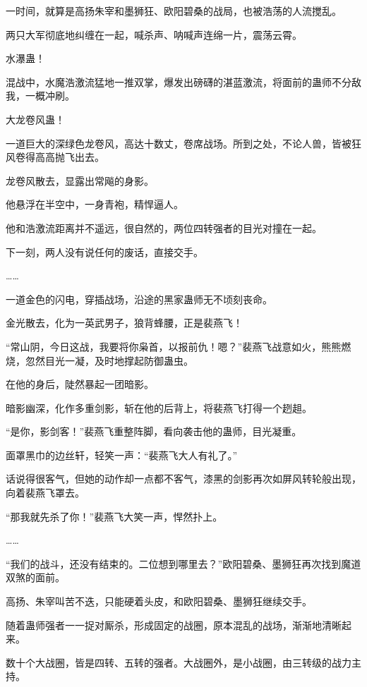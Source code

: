 
\begin{this_body}

一时间，就算是高扬朱宰和墨狮狂、欧阳碧桑的战局，也被浩荡的人流搅乱。

两只大军彻底地纠缠在一起，喊杀声、呐喊声连绵一片，震荡云霄。

水瀑蛊！

混战中，水魔浩激流猛地一推双掌，爆发出磅礴的湛蓝激流，将面前的蛊师不分敌我，一概冲刷。

大龙卷风蛊！

一道巨大的深绿色龙卷风，高达十数丈，卷席战场。所到之处，不论人兽，皆被狂风卷得高高抛飞出去。

龙卷风散去，显露出常飚的身影。

他悬浮在半空中，一身青袍，精悍逼人。

他和浩激流距离并不遥远，很自然的，两位四转强者的目光对撞在一起。

下一刻，两人没有说任何的废话，直接交手。

……

一道金色的闪电，穿插战场，沿途的黑家蛊师无不顷刻丧命。

金光散去，化为一英武男子，狼背蜂腰，正是裴燕飞！

“常山阴，今日这战，我要将你枭首，以报前仇！嗯？”裴燕飞战意如火，熊熊燃烧，忽然目光一凝，及时地撑起防御蛊虫。

在他的身后，陡然暴起一团暗影。

暗影幽深，化作多重剑影，斩在他的后背上，将裴燕飞打得一个趔趄。

“是你，影剑客！”裴燕飞重整阵脚，看向袭击他的蛊师，目光凝重。

面罩黑巾的边丝轩，轻笑一声：“裴燕飞大人有礼了。”

话说得很客气，但她的动作却一点都不客气，漆黑的剑影再次如屏风转轮般出现，向着裴燕飞罩去。

“那我就先杀了你！”裴燕飞大笑一声，悍然扑上。

……

“我们的战斗，还没有结束的。二位想到哪里去？”欧阳碧桑、墨狮狂再次找到魔道双煞的面前。

高扬、朱宰叫苦不迭，只能硬着头皮，和欧阳碧桑、墨狮狂继续交手。

随着蛊师强者一一捉对厮杀，形成固定的战圈，原本混乱的战场，渐渐地清晰起来。

数十个大战圈，皆是四转、五转的强者。大战圈外，是小战圈，由三转级的战力主持。


\end{this_body}
